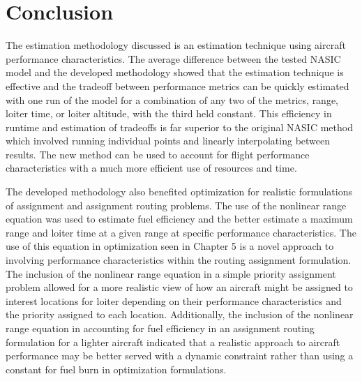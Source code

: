 \section{Conclusion}
The estimation methodology discussed is an estimation technique using aircraft performance characteristics. The average difference between the tested NASIC model and the developed methodology showed that the estimation technique is effective and the tradeoff between performance metrics can be quickly estimated with one run of the model for a combination of any two of the metrics, range, loiter time, or loiter altitude, with the third held constant. This efficiency in runtime and estimation of tradeoffs is far superior to the original NASIC method which involved running individual points and linearly interpolating between results. The new method can be used to account for flight performance characteristics with a much more efficient use of resources and time.\par
The developed methodology also benefited optimization for realistic formulations of assignment and assignment routing problems. The use of  the nonlinear range equation was used to estimate fuel efficiency and the better estimate a maximum range and loiter time at a given range at specific performance characteristics. The use of this equation in optimization seen in Chapter 5 is a novel approach to involving performance characteristics within the routing assignment formulation. The inclusion of the nonlinear range equation in a simple priority assignment problem allowed for a more realistic view of how an aircraft might be assigned to interest locations for loiter depending on their performance characteristics and the priority assigned to each location. Additionally, the inclusion of the nonlinear range equation in accounting for fuel efficiency in an assignment routing formulation for a lighter aircraft indicated that a realistic approach to aircraft performance may be better served with a dynamic constraint rather than using a constant for fuel burn in optimization formulations.
